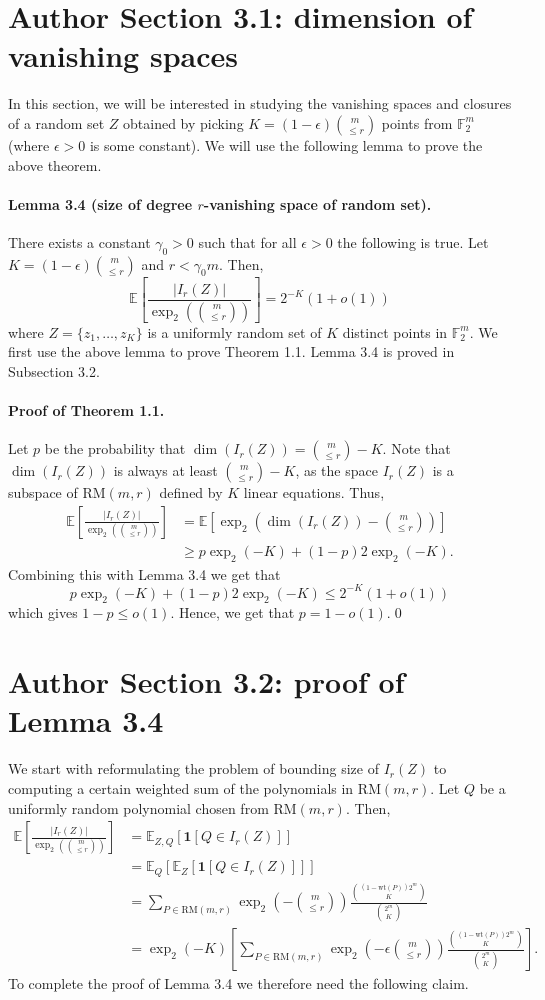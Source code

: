 \section*{Author Section 3.1: dimension of vanishing spaces}
In this section, we will be interested in studying the vanishing spaces and closures of a random set $Z$ obtained by picking $K=(1-\epsilon)\binom m{\le r}$ points from $\mathbb F_2^m$ (where $\epsilon>0$ is some constant). We will use the following lemma to prove the above theorem.
\paragraph{Lemma 3.4 (size of degree $r$-vanishing space of random set).} There exists a constant $\gamma_0>0$ such that for all $\epsilon>0$ the following is true. Let $K=(1-\epsilon)\binom m{\le r}$ and $r<\gamma_0m$. Then,
\[\mathbb E\left[\frac{|I_r(Z)|}{\operatorname{exp}_2\left(\binom m{\le r}\right)}\right]=2^{-K}(1+o(1))\]
where $Z=\{z_1,\ldots,z_K\}$ is a uniformly random set of $K$ distinct points in $\mathbb F_2^m$. We first use the above lemma to prove Theorem 1.1. Lemma 3.4 is proved in Subsection 3.2.
\paragraph{Proof of Theorem 1.1.} Let $p$ be the probability that $\dim(I_r(Z))=\binom m{\le r}-K$. Note that $\dim(I_r(Z))$ is always at least $\binom m{\le r}-K$, as the space $I_r(Z)$ is a subspace of $\mathrm{RM}(m,r)$ defined by $K$ linear equations. Thus,
\begin{align*}\mathbb E\left[\frac{|I_r(Z)|}{\operatorname{exp}_2\left(\binom m{\le r}\right)}\right]&=\mathbb E\left[\operatorname{exp}_2\left(\dim(I_r(Z))-\binom m{\le r}\right)\right]\\&\ge p\operatorname{exp}_2(-K)+(1-p)2\operatorname{exp}_2(-K).\end{align*}
Combining this with Lemma 3.4 we get that
\[p\operatorname{exp}_2(-K)+(1-p)2\operatorname{exp}_2(-K)\le2^{-K}(1+o(1))\]
which gives $1-p\le o(1)$. Hence, we get that $p=1-o(1)$.\qed
\section*{Author Section 3.2: proof of Lemma 3.4}
We start with reformulating the problem of bounding size of $I_r(Z)$ to computing a certain weighted sum of the polynomials in $\mathrm{RM}(m,r)$. Let $Q$ be a uniformly random polynomial chosen from $\mathrm{RM}(m,r)$. Then,
\begin{align*}
\mathbb E\left[\frac{|I_r(Z)|}{\operatorname{exp}_2\left(\binom m{\le r}\right)}\right]&=\mathbb E_{Z,Q}[\mathbf1[Q\in I_r(Z)]]\\&=\mathbb E_Q[\mathbb E_Z[\mathbf1[Q\in I_r(Z)]]]\\
&=\sum_{P\in\mathrm{RM}(m,r)}\operatorname{exp}_2\left(-\binom m{\le r}\right)\frac{\binom{(1-\mathrm{wt}(P))2^m}K}{\binom{2^m}K}\\
&=\operatorname{exp}_2(-K)\left[\sum_{P\in\mathrm{RM}(m,r)}\operatorname{exp}_2\left(-\epsilon\binom m{\le r}\right)\frac{\binom{(1-\mathrm{wt}(P))2^m}K}{\binom{2^m}K}\right].
\end{align*}
To complete the proof of Lemma 3.4 we therefore need the following claim.
